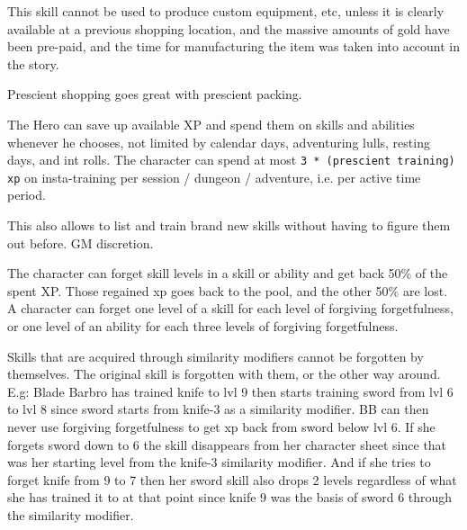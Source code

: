 This skill cannot be used to produce custom equipment, etc, unless it is clearly available at a previous shopping location, and the massive amounts of gold have been pre-paid, and the time for manufacturing the item was taken into account in the story.

Prescient shopping goes great with prescient packing.


 The Hero can save up available XP and spend them on skills and abilities whenever he chooses, not limited by calendar days, adventuring lulls, resting days, and int rolls. The character can spend at most \verb|3 * (prescient training) xp| on insta-training per session / dungeon / adventure, i.e. per active time period.

This also allows to list and train brand new skills without having to figure them out before. GM discretion.


 The character can forget skill levels in a skill or ability and get back 50\% of the spent XP. Those regained xp goes back to the pool, and the other 50\% are lost.
A character can forget one level of a skill for each level of forgiving forgetfulness, or one level of an ability for each three levels of forgiving forgetfulness.

Skills that are acquired through similarity modifiers cannot be forgotten by themselves. The original skill is forgotten with them, or the other way around.
E.g: Blade Barbro has trained knife to lvl 9 then starts training sword from lvl 6 to lvl 8 since sword starts from knife-3 as a similarity modifier. BB can then never use forgiving forgetfulness to get xp back from sword below lvl 6. If she forgets sword down to 6 the skill disappears from her character sheet since that was her starting level from the knife-3 similarity modifier.
And if she tries to forget knife from 9 to 7 then her sword skill also drops 2 levels regardless of what she has trained it to at that point since knife 9 was the basis of sword 6 through the similarity modifier.



\closeskillslist

















